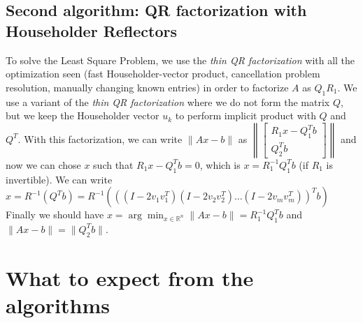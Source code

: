 \documentclass{article}
\begin{document}
\subsection{Second algorithm: QR factorization with Householder Reflectors}\label{subsec:qr-factorization-with-householder-reflectors}
To solve the Least Square Problem, we use the \textit{thin QR factorization} with all the optimization seen (fast Householder-vector product, cancellation problem resolution, manually changing known entries) in order to factorize $A$ as $Q_{1}R_{1}$.
We use a variant \cite{nla} of the \textit{thin QR factorization} where we do not form the matrix $Q$, but we keep the Householder vector $u_{k}$ to perform implicit product with $Q$ and $Q^{T}$.
With this factorization, we can write $\|Ax - b\|$ as $\left\lVert \begin{bmatrix} R_{1}x - Q_{1}^{T}b \\ Q_{2}^{T}b\end{bmatrix} \right\lVert$
and now we can chose $x$ such that $R_{1}x - Q_{1}^{T}b = 0$, which is $x = R_{1}^{-1}Q_{1}^{T}b$ (if $R_{1}$ is invertible).
We can write $x = R^{-1}(Q^{T}b) = R^{-1}(((I-2v_{1}v_{1}^{T})(I-2v_{2}v_{2}^{T})\dots(I-2v_{m}v_{m}^{T}))^{T}b)$
Finally we should have $x  = \arg\!\min_{x \in  \mathds{R}^n}\|Ax - b\| = R_{1}^{-1}Q_{1}^{T}b$ and $\|Ax - b\| = \|Q_{2}^{T}b\|$.

\newpage
\section{What to expect from the algorithms}\label{sec:what-to-expect-from-the-algorithms}
\end{document}
